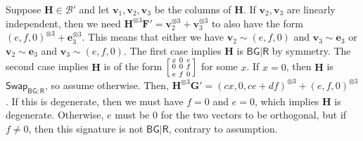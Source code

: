 \documentclass[11pt]{article}
\newcommand{\db}{\mathsf{B}}
\newcommand{\dg}{\mathsf{G}}
\newcommand{\dr}{\mathsf{R}}
\newcommand{\swhelper}[1]{$\mathsf{Swap}_{#1}$\xspace}
\newcommand{\swbg}{\swhelper{\db \dg; \dr}}
\newcommand{\teh}{^{\otimes 3}}
\begin{document}
\begin{enumerate}
    Suppose $\mathbf{H} \in \mathcal{B}'$ and let $\mathbf{v}_1, \mathbf{v}_2, \mathbf{v}_3$ be the columns of $\mathbf{H}$.
    If $\mathbf{v}_2, \mathbf{v}_3$ are linearly independent, then we need $\mathbf{H}\teh \mathbf{F}' = \mathbf{v}_2\teh + \mathbf{v}_3\teh$ to also have the form $(e, f, 0)\teh + \mathbf{e}_3\teh$.
    This means that either we have $\mathbf{v}_2 \sim (e, f, 0)$ and $\mathbf{v}_3 \sim \mathbf{e}_3$ or $\mathbf{v}_2 \sim \mathbf{e}_3$ and $\mathbf{v}_3 \sim (e, f, 0)$.
    The first case implies $\mathbf{H}$ is $\db \dg | \dr$ by symmetry.
    The second case implies $\mathbf{H}$ is of the form $\begin{bsmallmatrix}
      x & 0 & e \\
      0 & 0 & f \\
      e & f & 0
    \end{bsmallmatrix}$ for some $x$.
    If $x = 0$, then $\mathbf{H}$ is \swbg, so assume otherwise.
    Then, $\mathbf{H}\teh \mathbf{G}' = (cx, 0, ce + df)\teh + (e, f, 0)\teh$.
    If this is degenerate, then we must have $f = 0$ and $e = 0$, which implies $\mathbf{H}$ is degenerate.
    Otherwise, $e$ must be $0$ for the two vectors to be orthogonal, but if $f \ne 0$, then this signature is not $\db \dg | \dr$, contrary to assumption.


\end{enumerate}
\end{document}
